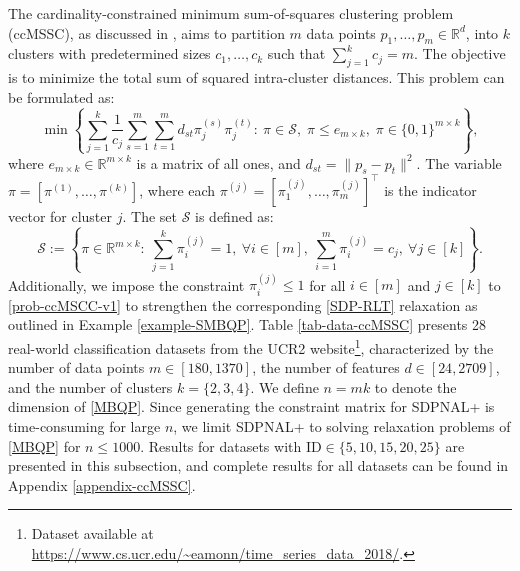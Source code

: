 \documentclass[11pt]{article}
\theoremstyle{plain}
\def\R{\mathbb{R}}
\begin{document}
The cardinality-constrained minimum sum-of-squares clustering problem (ccMSSC), as discussed in \cite{piccialli2023global}, aims to partition $m$ data points $p_1, \ldots, p_m \in \mathbb{R}^d$, into $k$ clusters with predetermined sizes $c_1, \ldots, c_k$ such that $\sum_{j=1}^k c_j = m$. The objective is to minimize the total sum of squared intra-cluster distances. This problem can be formulated as:
\begin{equation}\label{prob-ccMSCC-v1}
\min\left\{\sum_{j=1}^{k}\frac{1}{c_j} \sum_{s=1}^m\sum_{t=1}^m d_{st} \pi^{(s)}_j\pi_j^{(t)}:\ 
\pi\in \mathcal{S},\; \pi\leq e_{m\times k},\; \pi \in \{0,1\}^{m\times k} \right\},
\tag{ccMSSC}
\end{equation}
where $e_{m\times k}\in\R^{m\times k}$ is a matrix of all ones, and $d_{st}=\|p_s - p_t\|^2$. The variable $\pi = [\pi^{(1)}, \ldots, \pi^{(k)}]$, where each $\pi^{(j)} = [\pi^{(j)}_1, \ldots, \pi^{(j)}_m]^\top$ is the indicator vector for cluster $j$. The set $\mathcal{S}$ is defined as:
\begin{equation*}
\mathcal{S}:=\left\{\pi\in\R^{m\times k}:\  
\sum_{j=1}^k \pi^{(j)}_i= 1,\ \forall i\in[m],\ 
\sum_{i=1}^m \pi^{(j)}_i= c_j,\ \forall j\in[k] \right\}.
\end{equation*}
Additionally, we impose the constraint $\pi^{(j)}_i \leq 1$ for all $i \in [m]$ and $j \in [k]$ to \eqref{prob-ccMSCC-v1} 
to strengthen the corresponding \eqref{SDP-RLT} relaxation
as outlined in Example \ref{example-SMBQP}. Table \ref{tab-data-ccMSSC} presents 28 real-world classification datasets from the UCR2 website\footnote{Dataset available at \url{https://www.cs.ucr.edu/~eamonn/time_series_data_2018/}.}, characterized by the number of data points $m \in [180, 1370]$, the number of features $d \in [24, 2709]$, and the number of clusters $k = \{2,3,4\}$. We define $n = mk$ to denote the dimension of \eqref{MBQP}. Since generating the constraint matrix for SDPNAL+ is time-consuming for large $n$, we limit SDPNAL+ to solving relaxation problems of \eqref{MBQP} for $n \leq 1000$. Results for datasets with $\text{ID} \in\{5, 10, 15, 20, 25\}$ are presented in this subsection, and complete results for all datasets can be found in Appendix \ref{appendix-ccMSSC}.
\end{document}
